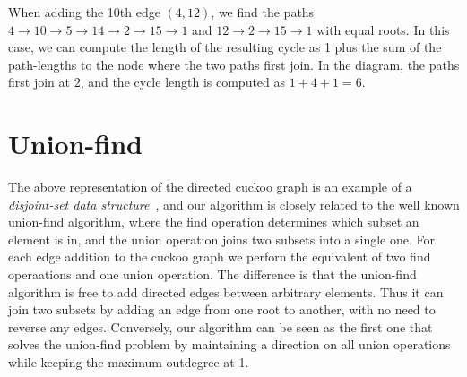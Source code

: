 \documentclass[11pt, oneside]{article}
\begin{document}
\begin{center}
\hspace{3cm}
\end{center}
When adding the 10th edge $(4,12)$, we find the paths $4 \rightarrow 10
\rightarrow 5 \rightarrow 14 \rightarrow 2 \rightarrow 15 \rightarrow 1$ and
$12 \rightarrow 2 \rightarrow 15 \rightarrow  1$ with equal roots.
In this case, we can compute the length of the resulting cycle as
1 plus the sum of the path-lengths to the node where the two paths first join.
In the diagram, the paths first join at $2$, and the cycle length is computed as $1+4+1=6$.

\section{Union-find}
The above representation of the directed cuckoo graph is an example of
a {\em disjoint-set data structure}~\cite{wikidsds2014}, and our algorithm is
closely related to the well known union-find algorithm, where the find operation
determines which subset an element is in, and the union operation joins two subsets
into a single one. For each edge addition to the cuckoo graph we perforn the equivalent
of two find operaations and one union operation.
The difference is that the union-find algorithm is free to add
directed edges between arbitrary elements. Thus it can join two subsets by adding an edge
from one root to another, with no need to reverse any edges. Conversely, our algorithm
can be seen as the first one that solves the union-find problem by maintaining
a direction on all union operations while keeping the maximum outdegree at 1.
\end{document}
